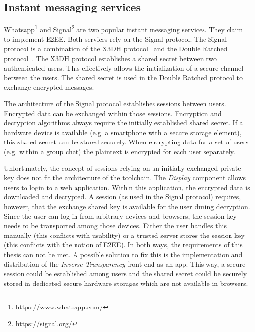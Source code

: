 \documentclass[../main.tex]{subfiles}
\begin{document}
\subsection{Instant messaging services}
Whatsapp\footnote{\url{https://www.whatsapp.com/}} and Signal\footnote{\url{https://signal.org/}} are two popular instant messaging services.
They claim to implement E2EE.
Both services rely on the Signal protocol.
The Signal protocol is a combination of the X3DH protocol~\cite{Marlinspike2016} and the Double Ratched protocol~\cite{Perrin2016}.
The X3DH protocol establishes a shared secret between two authenticated users.
This effectively allows the initialization of a secure channel between the users.
The shared secret is used in the Double Ratched protocol to exchange encrypted messages.~\cite{Marlinspike2016, Perrin2016}

The architecture of the Signal protocol establishes sessions between users.
Encrypted data can be exchanged within those sessions.
Encryption and decryption algorithms always require the initially established shared secret.
If a hardware device is available (e.g. a smartphone with a secure storage element), this shared secret can be stored securely. 
When encrypting data for a set of users (e.g. within a group chat) the plaintext is encrypted for each user separately.~\cite{Marlinspike2014}

Unfortunately, the concept of sessions relying on an initially exchanged private key does not fit the architecture of the toolchain.
The \emph{Display} component allows users to login to a web application.
Within this application, the encrypted data is downloaded and decrypted.
A session (as used in the Signal protocol) requires, however, that the exchange shared key is available for the user during decryption.
Since the user can log in from arbitrary devices and browsers, the session key needs to be transported among those devices.
Either the user handles this manually (this conflicts with usability) or a trusted server stores the session key (this conflicts with the notion of E2EE).
In both ways, the requirements of this thesis can not be met.
A possible solution to fix this is the implementation and distribution of the \emph{Inverse Transparency} front-end as an app.
This way, a secure session could be established among users and the shared secret could be securely stored in dedicated secure hardware storages which are not available in browsers.
\end{document}
